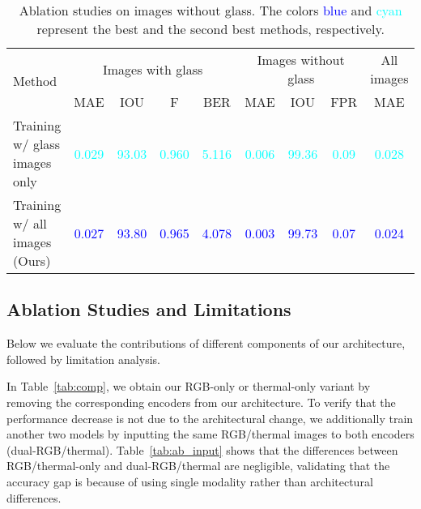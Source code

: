 \begin{table*}[ht]
\renewcommand\arraystretch{1.5}
\setlength\tabcolsep{5pt}
\centering
\caption{Ablation studies on images without glass. The colors \textcolor{blue}{blue} and \textcolor{cyan}{cyan} represent the best and the second best methods, respectively.} 
\label{tab:ab_glass}
\begin{tabular}{lcccccccc} 
\toprule
\multirow{2}{*}{Method} & \multicolumn{4}{c}{Images with glass} & \multicolumn{3}{c}{Images without glass} & All images        \\ 
\cmidrule[0.25pt](lr){2-5} \cmidrule[0.25pt](lr){6-8} \cmidrule[0.25pt](lr){9-9} 
& MAE                       & IOU                         & F                     & BER                       & MAE                       & IOU                    & FPR                      & MAE   \\ 
\midrule


Training w/ glass images only & \multicolumn{1}{c}{\textcolor{cyan}{0.029}} & \multicolumn{1}{c}{\textcolor{cyan}{93.03}} & \multicolumn{1}{c}{\textcolor{cyan}{0.960}} & \textcolor{cyan}{5.116} & \multicolumn{1}{c}{\textcolor{cyan}{0.006}} & \multicolumn{1}{c}{\textcolor{cyan}{99.36}} & \textcolor{cyan}{0.09} & \textcolor{cyan}{0.028}\\ \hline
Training w/ all images (Ours) & \multicolumn{1}{c}{\textcolor{blue}{0.027}} & \multicolumn{1}{c}{\textcolor{blue}{93.80}} & \multicolumn{1}{c}{\textcolor{blue}{0.965}} & \textcolor{blue}{4.078} & \multicolumn{1}{c}{\textcolor{blue}{0.003}} & \multicolumn{1}{c}{\textcolor{blue}{99.73}} & \textcolor{blue}{0.07} &\textcolor{blue}{0.024}\\ 
\bottomrule
\end{tabular}
\end{table*}




\subsection{Ablation Studies and Limitations}\label{sec:ablation}
Below we evaluate the contributions of different components of our architecture, followed by limitation analysis.

 In Table~\ref{tab:comp}, we obtain our RGB-only or thermal-only variant by removing the corresponding encoders from our architecture. To verify that the performance decrease is not due to the architectural change, we additionally train another two models by inputting the same RGB/thermal images to both encoders (dual-RGB/thermal). Table~\ref{tab:ab_input} shows that the differences between RGB/thermal-only and dual-RGB/thermal are negligible, validating that the accuracy gap is because of using single modality rather than architectural differences. 


